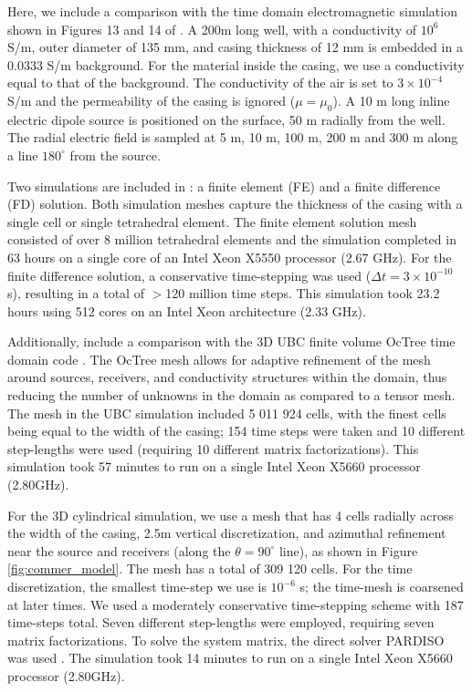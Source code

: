 Here, we include a comparison with the time domain electromagnetic simulation shown in Figures 13 and 14 of \cite{Commer2015}. A 200m long well, with a conductivity of $10^{6}$ S/m, outer diameter of 135 mm, and casing thickness of 12 mm is embedded in a 0.0333 S/m background. For the material inside the casing, we use a conductivity equal to that of the background. The conductivity of the air is set to $3 \times 10^{-4}$ S/m and the permeability of the casing is ignored ($\mu = \mu_0$). A 10 m long inline electric dipole source is positioned on the surface, 50 m radially from the well. The radial electric field is sampled at 5 m, 10 m, 100 m, 200 m and 300 m along a line $180^{\circ}$ from the source.

Two simulations are included in \cite{Commer2015}: a finite element (FE) and a finite difference (FD) solution. Both simulation meshes capture the thickness of the casing with a single cell or single tetrahedral element. The finite element solution mesh consisted of over 8 million tetrahedral elements and the simulation completed in 63 hours on a single core of an Intel Xeon X5550 processor (2.67 GHz). For the finite difference solution, a conservative time-stepping was used ($\Delta t = 3 \times 10^{-10}$ s), resulting in a total of $>$120 million time steps. This simulation took 23.2 hours using 512 cores on an Intel Xeon architecture (2.33 GHz).

Additionally, include a comparison with the 3D UBC finite volume OcTree time domain code \citep{Haber2007}. The OcTree mesh allows for adaptive refinement of the mesh around sources, receivers, and conductivity structures within the domain, thus reducing the number of unknowns in the domain as compared to a tensor mesh. The mesh in the UBC simulation included 5 011 924 cells, with the finest cells being equal to the width of the casing; 154 time steps were taken and 10 different step-lengths were used (requiring 10 different matrix factorizations). This simulation took 57 minutes to run on a single Intel Xeon X5660 processor (2.80GHz).

For the 3D cylindrical simulation, we use a mesh that has 4 cells radially across the width of the casing, 2.5m vertical discretization, and azimuthal refinement near the source and receivers (along the $\theta=90^\circ$ line), as shown in Figure \ref{fig:commer_model}. The mesh has a total of 309 120 cells. For the time discretization, the smallest time-step we use is $10^{-6}$ s; the time-mesh is coarsened at later times. We used a moderately conservative time-stepping scheme with 187 time-steps total. Seven different step-lengths were employed, requiring seven matrix factorizations. To solve the system matrix, the direct solver PARDISO was used \citep{Petra2014, Cosmin2016}. The simulation took 14 minutes to run on a single Intel Xeon X5660 processor (2.80GHz).



